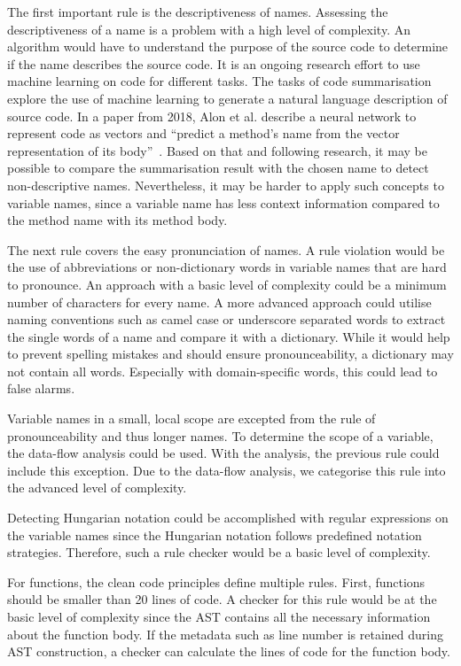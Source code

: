 The first important rule is the descriptiveness of names. Assessing the descriptiveness of a name is a problem with a high level of complexity. An algorithm would have to understand the purpose of the source code to determine if the name describes the source code. It is an ongoing research effort to use machine learning on code for different tasks. The tasks of code summarisation explore the use of machine learning to generate a natural language description of source code. In a paper from 2018, Alon et al. describe a neural network to represent code as vectors and \enquote{predict a method’s name from the vector representation of its body}~\cite{alon_code2vec_2018}. Based on that and following research, it may be possible to compare the summarisation result with the chosen name to detect non-descriptive names. Nevertheless, it may be harder to apply such concepts to variable names, since a variable name has less context information compared to the method name with its method body.

The next rule covers the easy pronunciation of names. A rule violation would be the use of abbreviations or non-dictionary words in variable names that are hard to pronounce. An approach with a basic level of complexity could be a minimum number of characters for every name. A more advanced approach could utilise naming conventions such as camel case or underscore separated words to extract the single words of a name and compare it with a dictionary. While it would help to prevent spelling mistakes and should ensure pronounceability, a dictionary may not contain all words. Especially with domain-specific words, this could lead to false alarms.

Variable names in a small, local scope are excepted from the rule of pronounceability and thus longer names. To determine the scope of a variable, the data-flow analysis could be used. With the analysis, the previous rule could include this exception. Due to the data-flow analysis, we categorise this rule into the advanced level of complexity.

Detecting Hungarian notation could be accomplished with regular expressions on the variable names since the Hungarian notation follows predefined notation strategies. Therefore, such a rule checker would be a basic level of complexity.


For functions, the clean code principles define multiple rules. 
First, functions should be smaller than 20 lines of code. A checker for this rule would be at the basic level of complexity since the AST contains all the necessary information about the function body. If the metadata such as line number is retained during AST construction, a checker can calculate the lines of code for the function body.

